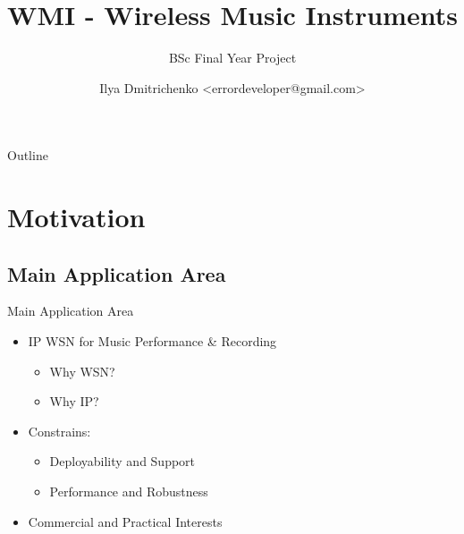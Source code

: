 \documentclass{beamer}
\title[WMI] %
{WMI - Wireless Music Instruments}
\subtitle
{BSc Final Year Project}
\author[Dmitrichenko, Ilya] %
{Ilya Dmitrichenko <errordeveloper@gmail.com>}
\date[November 2010] %
\begin{document}
\begin{frame}
  \titlepage
\end{frame}

\begin{frame}{Outline}
  \tableofcontents[pausesections]
\end{frame}





\section{Motivation}

\subsection{Main Application Area}

\begin{frame}{Main Application Area}
\begin{itemize}

	\item{IP WSN for Music Performance \& Recording}

	\begin{itemize}

	\item Why WSN?
	\item Why IP?

	\end{itemize}

	\item{Constrains:}

	\begin{itemize}
		
		\item Deployability and Support
		\item Performance and Robustness

	\end{itemize}

	\item{Commercial and Practical Interests}

\end{itemize}
\end{frame}
\end{document}
